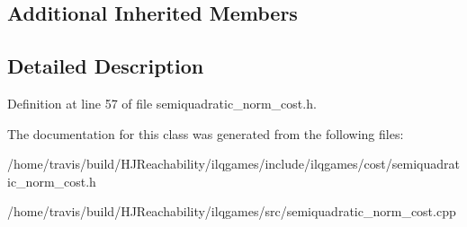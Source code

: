 \subsection*{Additional Inherited Members}


\subsection{Detailed Description}


Definition at line 57 of file semiquadratic\+\_\+norm\+\_\+cost.\+h.



The documentation for this class was generated from the following files\+:\begin{DoxyCompactItemize}
\item 
/home/travis/build/\+H\+J\+Reachability/ilqgames/include/ilqgames/cost/semiquadratic\+\_\+norm\+\_\+cost.\+h\item 
/home/travis/build/\+H\+J\+Reachability/ilqgames/src/semiquadratic\+\_\+norm\+\_\+cost.\+cpp\end{DoxyCompactItemize}
